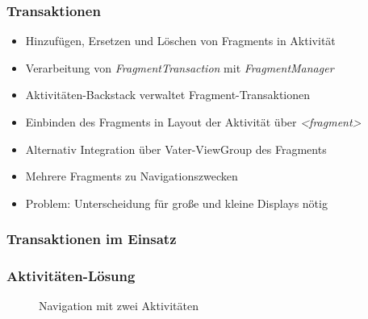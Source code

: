 \begin{frame}[label=fragment_transactions]
   \frametitle{Transaktionen}
   \begin{itemize}
      \item Hinzufügen, Ersetzen und Löschen von Fragments in Aktivität
      \item Verarbeitung von \emph{FragmentTransaction} mit \emph{FragmentManager}
      \item Aktivitäten-Backstack verwaltet Fragment-Transaktionen
      \item Einbinden des Fragments in Layout der Aktivität über \emph{\textless{}fragment\textgreater}
      \item Alternativ Integration über Vater-ViewGroup des Fragments
      \item Mehrere Fragments zu Navigationszwecken
      \item Problem: Unterscheidung für große und kleine Displays nötig
   \end{itemize}
\end{frame}

\begin{frame}[label=fragment_transactions]
   \frametitle{Transaktionen im Einsatz}
	
\end{frame}

\begin{frame}[label=activity_layout]
   \frametitle{Aktivitäten-Lösung}
	\begin{figure}[h!]
	  \centering
	  \hfill
	  \caption{
		  Navigation mit zwei Aktivitäten
	  }
	  \label{fig:ubuntu_activity_list}
	\end{figure}
\end{frame}

